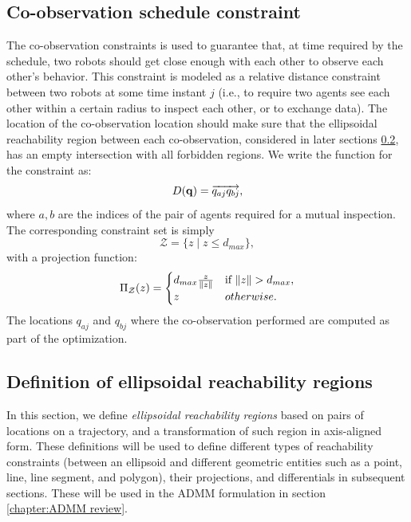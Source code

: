 \documentclass[journal]{IEEEtran}  %
\def\sZ{\mathcal{Z}}
\begin{document}
\subsection{Co-observation schedule constraint}
The co-observation constraints is used to guarantee that, at time required by the schedule, two robots should get close enough with each other to observe each other's behavior. This constraint is modeled as a relative distance constraint between two robots at some time instant $j$ (i.e., to require two agents see each other within a certain radius to inspect each other, or to exchange data). The location of the co-observation location should make sure that the ellipsoidal reachability region between each co-observation, considered in later sections \ref{sec:reachability}, has an empty intersection with all forbidden regions.
 We write the function for the constraint as:
\begin{align}
D(\mathbf{q}) = \overrightarrow{q_{aj}q_{bj}},
\end{align}
where $a,b$ are the indices of the pair of agents required for a mutual inspection. The corresponding constraint set is simply
\begin{equation}
\sZ= \{z \mid z \leq d_{max} \},
\end{equation}
with a projection function:
\begin{equation}\label{eq:co-observation_constraint_update}
\Pi_{\sZ}(z) = \begin{cases}
d_{max}\frac{z}{\norm{z}} &\text{if } \norm{z} > d_{max},\\
z	& otherwise.
\end{cases}
\end{equation}
The locations $q_{aj}$ and $q_{bj}$ where the co-observation performed are computed as part of the optimization.

\subsection{Definition of ellipsoidal reachability regions}\label{sec:reachability}
  In this section, we define  \emph{ellipsoidal reachability regions} based on pairs of locations on a trajectory, and a transformation of such region in axis-aligned form. These definitions will be used to define different types of reachability constraints (between an ellipsoid and different geometric entities such as a point, line, line segment, and polygon), their projections, and differentials in subsequent sections. 
  These will be used in the ADMM formulation in section \ref{chapter:ADMM review}.
\end{document}
